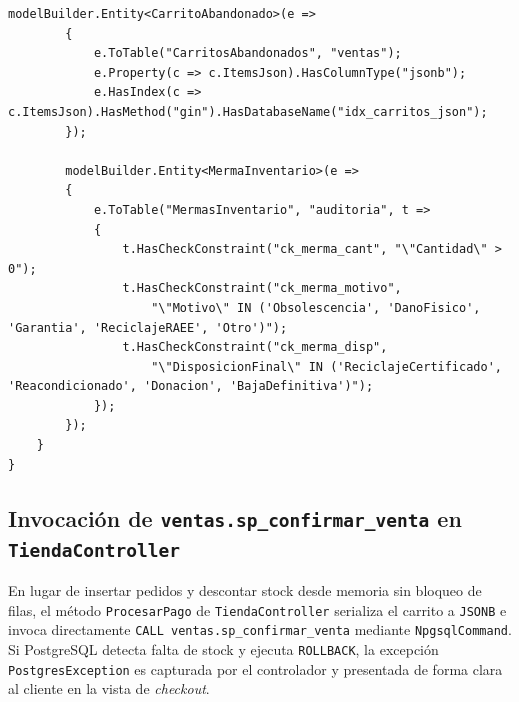 \begin{lstlisting}[language={[Sharp]C}, caption={Extracto real de ApplicationDbContext.cs con mapeo multiesquema y restricciones}, label=lst:efcore]
        modelBuilder.Entity<CarritoAbandonado>(e =>
        {
            e.ToTable("CarritosAbandonados", "ventas");
            e.Property(c => c.ItemsJson).HasColumnType("jsonb");
            e.HasIndex(c => c.ItemsJson).HasMethod("gin").HasDatabaseName("idx_carritos_json");
        });

        modelBuilder.Entity<MermaInventario>(e =>
        {
            e.ToTable("MermasInventario", "auditoria", t =>
            {
                t.HasCheckConstraint("ck_merma_cant", "\"Cantidad\" > 0");
                t.HasCheckConstraint("ck_merma_motivo",
                    "\"Motivo\" IN ('Obsolescencia', 'DanoFisico', 'Garantia', 'ReciclajeRAEE', 'Otro')");
                t.HasCheckConstraint("ck_merma_disp",
                    "\"DisposicionFinal\" IN ('ReciclajeCertificado', 'Reacondicionado', 'Donacion', 'BajaDefinitiva')");
            });
        });
    }
}
\end{lstlisting}

\subsection{Invocaci\'on de \texttt{ventas.sp\_confirmar\_venta} en \texttt{TiendaController}}

En lugar de insertar pedidos y descontar stock desde memoria sin bloqueo de filas, el m\'etodo \texttt{ProcesarPago} de \texttt{TiendaController} serializa el carrito a \texttt{JSONB} e invoca directamente \texttt{CALL ventas.sp\_confirmar\_venta} mediante \texttt{NpgsqlCommand}.
Si PostgreSQL detecta falta de stock y ejecuta \texttt{ROLLBACK}, la excepci\'on \texttt{PostgresException} es capturada por el controlador y presentada de forma clara al cliente en la vista de \textit{checkout}.

